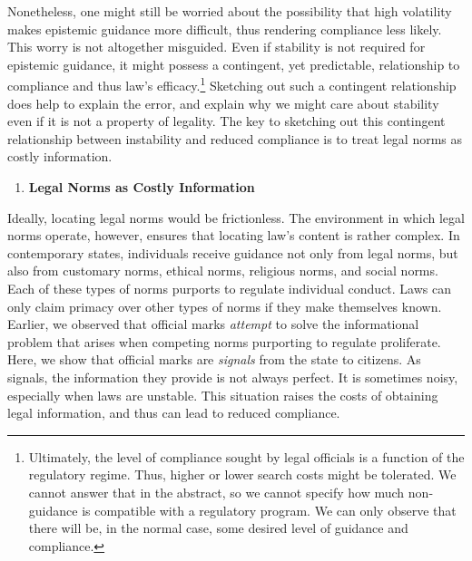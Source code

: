 Nonetheless, one might still be worried about the possibility that high
volatility makes epistemic guidance more difficult, thus rendering
compliance less likely. This worry is not altogether misguided. Even if
stability is not required for epistemic guidance, it might possess a
contingent, yet predictable, relationship to compliance and thus law's
efficacy.\footnote{Ultimately, the level of compliance sought by legal
  officials is a function of the regulatory regime. Thus, higher or
  lower search costs might be tolerated. We cannot answer that in the
  abstract, so we cannot specify how much non-guidance is compatible
  with a regulatory program. We can only observe that there will be, in
  the normal case, some desired level of guidance and compliance.}
Sketching out such a contingent relationship does help to explain the
error, and explain why we might care about stability even if it is not a
property of legality. The key to sketching out this contingent
relationship between instability and reduced compliance is to treat
legal norms as costly information.

\begin{enumerate}
\def\labelenumi{\arabic{enumi}.}
\item
  \textbf{Legal Norms as Costly Information}
\end{enumerate}

Ideally, locating legal norms would be frictionless. The environment in
which legal norms operate, however, ensures that locating law's content
is rather complex. In contemporary states, individuals receive guidance
not only from legal norms, but also from customary norms, ethical norms,
religious norms, and social norms. Each of these types of norms purports
to regulate individual conduct. Laws can only claim primacy over other
types of norms if they make themselves known. Earlier, we observed that
official marks \emph{attempt} to solve the informational problem that
arises when competing norms purporting to regulate proliferate. Here, we
show that official marks are \emph{signals} from the state to citizens.
As signals, the information they provide is not always perfect. It is
sometimes noisy, especially when laws are unstable. This situation
raises the costs of obtaining legal information, and thus can lead to
reduced compliance.


